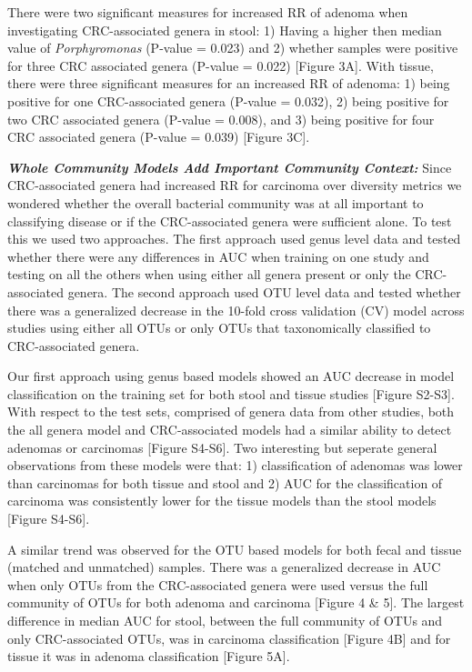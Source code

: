 \documentclass[12pt,]{article}
\begin{document}
There were two significant measures for increased RR of adenoma when
investigating CRC-associated genera in stool: 1) Having a higher then
median value of \emph{Porphyromonas} (P-value = 0.023) and 2) whether
samples were positive for three CRC associated genera (P-value = 0.022)
{[}Figure 3A{]}. With tissue, there were three significant measures for
an increased RR of adenoma: 1) being positive for one CRC-associated
genera (P-value = 0.032), 2) being positive for two CRC associated
genera (P-value = 0.008), and 3) being positive for four CRC associated
genera (P-value = 0.039) {[}Figure 3C{]}.

\textbf{\emph{Whole Community Models Add Important Community Context:}}
Since CRC-associated genera had increased RR for carcinoma over
diversity metrics we wondered whether the overall bacterial community
was at all important to classifying disease or if the CRC-associated
genera were sufficient alone. To test this we used two approaches. The
first approach used genus level data and tested whether there were any
differences in AUC when training on one study and testing on all the
others when using either all genera present or only the CRC-associated
genera. The second approach used OTU level data and tested whether there
was a generalized decrease in the 10-fold cross validation (CV) model
across studies using either all OTUs or only OTUs that taxonomically
classified to CRC-associated genera.

Our first approach using genus based models showed an AUC decrease in
model classification on the training set for both stool and tissue
studies {[}Figure S2-S3{]}. With respect to the test sets, comprised of
genera data from other studies, both the all genera model and
CRC-associated models had a similar ability to detect adenomas or
carcinomas {[}Figure S4-S6{]}. Two interesting but seperate general
observations from these models were that: 1) classification of adenomas
was lower than carcinomas for both tissue and stool and 2) AUC for the
classification of carcinoma was consistently lower for the tissue models
than the stool models {[}Figure S4-S6{]}.

A similar trend was observed for the OTU based models for both fecal and
tissue (matched and unmatched) samples. There was a generalized decrease
in AUC when only OTUs from the CRC-associated genera were used versus
the full community of OTUs for both adenoma and carcinoma {[}Figure 4 \&
5{]}. The largest difference in median AUC for stool, between the full
community of OTUs and only CRC-associated OTUs, was in carcinoma
classification {[}Figure 4B{]} and for tissue it was in adenoma
classification {[}Figure 5A{]}.
\end{document}
